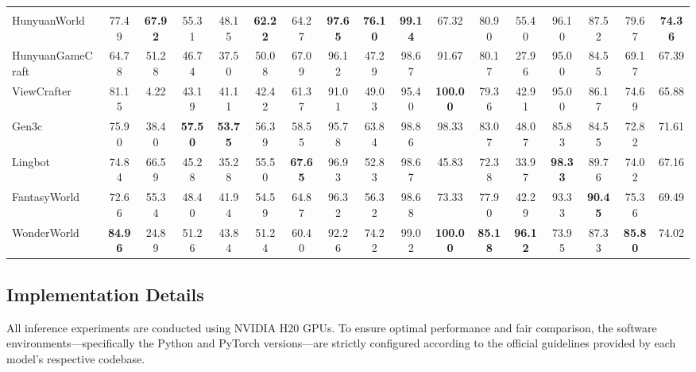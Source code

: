 \begin{table}
\begin{adjustbox}{width=\textwidth}
\begin{tabular}{
l
*{5}{S}
*{6}{S}
c
*{3}{S}
S
}
\\
HunyuanWorld        & 77.49 & \textbf{67.92} & 55.31 & 48.15 & \textbf{62.22} & 64.27 & \textbf{97.65} & \textbf{76.10} & \textbf{99.14} & 67.32 & 80.90 & 55.40 & 96.10 & 87.52 & 79.67 & \textbf{74.36} \\
HunyuanGameCraft  & 64.78 & 51.28 & 46.74 & 37.50 & 50.08 & 67.09 & 96.12 & 47.29 & 98.67 & 91.67 & 80.17 & 27.96 & 95.00 & 84.55 & 69.17 & 67.39 \\
ViewCrafter         & 81.15 & 4.22 & 43.19 & 41.11 & 42.42 & 61.37 & 91.01 & 49.03 & 95.40 & \textbf{100.00} & 79.36 & 42.91 & 95.00 & 86.17 & 74.69 & 65.88 \\
Gen3c               & 75.90 & 38.40 & \textbf{57.50} & \textbf{53.75} & 56.39 & 58.55 & 95.78 & 63.84 & 98.86 & 98.33 & 83.07 & 48.07 & 85.83 & 84.55 & 72.82 & 71.61 \\
Lingbot             & 74.84 & 66.59 & 45.28 & 35.28 & 55.50 & \textbf{67.65} & 96.93 & 52.83 & 98.67 & 45.83 & 72.38 & 33.97 & \textbf{98.33} & 89.76 & 74.02& 67.16 \\
FantasyWorld        & 72.66 & 55.34 & 48.40 & 41.94 & 54.59 & 64.87 & 96.32 & 56.32 & 98.68 & 73.33 & 77.90 & 42.29 & 93.33 & \textbf{90.45} & 75.36 & 69.49 \\
WonderWorld         & \textbf{84.96} & 24.89 & 51.26 & 43.84 & 51.24 & 60.40 & 92.26 & 74.22 & 99.02 & \textbf{100.00} & \textbf{85.18} & \textbf{96.12} & 73.95 & 87.33 & \textbf{85.80} & 74.02 \\
\bottomrule
\end{tabular}
\end{adjustbox}
\end{table}




\subsection{Implementation Details}

All inference experiments are conducted using NVIDIA H20 GPUs. To ensure optimal performance and fair comparison, the software environments—specifically the Python and PyTorch versions—are strictly configured according to the official guidelines provided by each model's respective codebase. 


